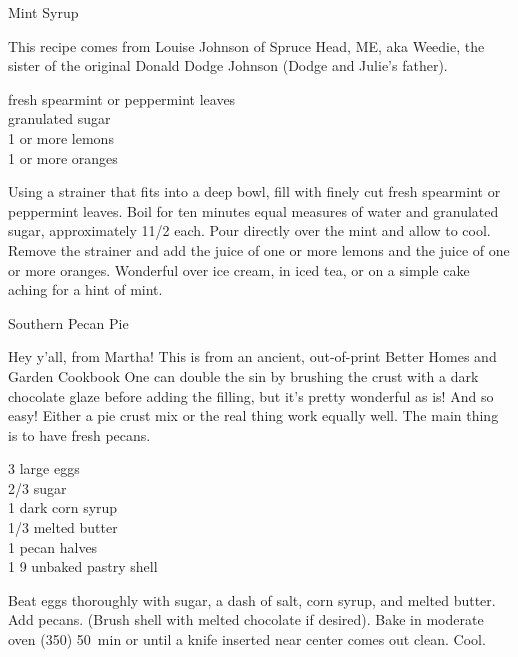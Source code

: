 
\begin{entry}{Mint Syrup}

\begin{open}
  This recipe comes from Louise Johnson of Spruce Head, ME, aka Weedie, the
  sister of the original Donald Dodge Johnson (Dodge and Julie’s father).
\end{open}
\begin{ingredients}
    fresh spearmint or peppermint leaves\\
    granulated sugar\\
    1 or more lemons\\
    1 or more oranges
\end{ingredients}
Using a strainer that fits into a deep bowl, fill with finely cut fresh
spearmint or peppermint leaves. Boil for ten minutes equal measures of water
and granulated sugar, approximately 1\SI{1/2}{\cup} each. Pour directly over
the mint and allow to cool. Remove the strainer and add the juice of one or
more lemons and the juice of one or more oranges. Wonderful over ice cream, in
iced tea, or on a simple cake aching for a hint of mint.
\end{entry}

\begin{entry}{Southern Pecan Pie}
\label{sec:pecanpie}

\begin{open}
  Hey y'all, from Martha! This is from an ancient, out-of-print Better Homes
  and Garden Cookbook One can double the sin by brushing the crust with a dark
  chocolate glaze before adding the filling, but it's pretty wonderful as is!
  And so easy! Either a pie crust mix or the real thing work equally well. The
  main thing is to have fresh pecans.
\end{open}
\begin{ingredients}
    3 large eggs\\
    \SI{2/3}{\cup} sugar\\
    \SI{1}{\cup} dark corn syrup\\
    \SI{1/3}{\cup} melted butter\\
    \SI{1}{\cup} pecan halves\\
    1 \SI{9}{\inch} unbaked pastry shell
\end{ingredients}
Beat eggs thoroughly with sugar, a dash of salt, corn syrup, and melted butter.
Add pecans. (Brush shell with melted chocolate if desired). Bake in moderate
oven (\SI{350}{\degreeF}) \SI{50}{\minute} or until a knife inserted near center
comes out clean. Cool.
\end{entry}


